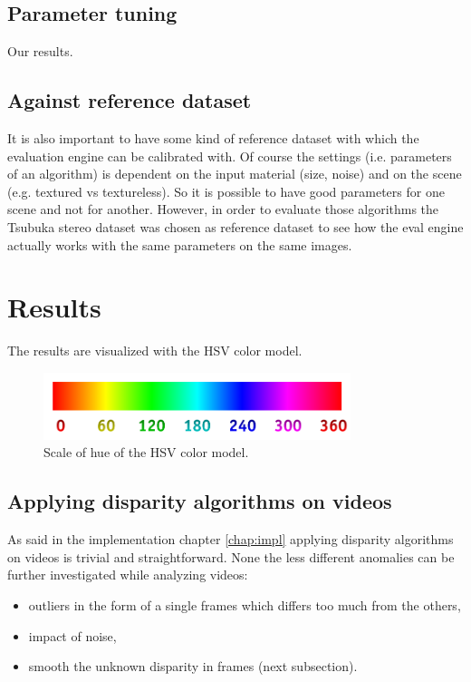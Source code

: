 \subsection*{Parameter tuning}

Our results.

\subsection*{Against reference dataset}

It is also important to have some kind of reference dataset with which the evaluation engine can be calibrated with.
Of course the settings (i.e. parameters of an algorithm) is dependent on the input material (size, noise) and on the scene (e.g. textured vs textureless).
So it is possible to have good parameters for one scene and not for another.
However, in order to evaluate those algorithms the Tsubuka stereo dataset was chosen as reference dataset to see how the eval engine actually works with the same parameters on the same images.

\section{Results}

The results are visualized with the HSV color model.

\begin{figure}[h!]
  \centering
  \includegraphics[width=0.8\textwidth]{src/images/hue-scale.png}
  \caption{Scale of hue of the HSV color model.}
  \label{fig:hue-scale}
\end{figure}


\subsection*{Applying disparity algorithms on videos}

As said in the implementation chapter \ref{chap:impl} applying disparity algorithms on videos is trivial and straightforward.
None the less different anomalies can be further investigated while analyzing videos:

\begin{itemize}
  \item outliers in the form of a single frames which differs too much from the others,
  \item impact of noise,
  \item smooth the unknown disparity in frames (next subsection).
\end{itemize}

